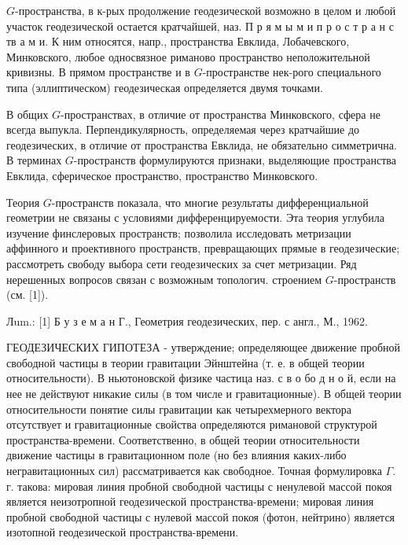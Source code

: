 \documentclass[10pt]{article}
\begin{document}
$G$-пространства, в к-рых продолжение геодезической возможно в целом и любой участок геодезической остается кратчайшей, наз. П р я м ы м и п р о с т р а н с тв а м и. К ним относятся, напр., пространства Евклида, Лобачевского, Минковского, любое односвязное риманово пространство неположительной кривизны. В прямом пространстве и в $G$-пространстве нек-рого специального типа (эллиптическом) геодезическая определяется двумя точками.



В общих $G$-пространствах, в отличие от пространства Минковского, сфера не всегда выпукла. Перпендикулярность, определяемая через кратчайшие до геодезических, в отличие от пространства Евклида, не обязательно симметрична. В терминах $G$-пространств формулируются признаки, выделяющие пространства Евклида, сферическое пространство, пространство Минковского.



Теория $G$-пространств показала, что многие результаты дифференциальной геометрии не связаны с условиями дифференцируемости. Эта теория углубила изучение финслеровых пространств; позволила исследовать метризации аффинного и проективного пространств, превращающих прямые в геодезические; рассмотреть свободу выбора сети геодезических за счет метризации. Ряд нерешенных вопросов связан с возможным топологич. строением $G$-пространств (см. [1]).



Лum.: [1] Б у з е м а н Г., Геометрия геодезических, пер. с англ., М., 1962.



ГЕОДЕЗИЧЕСКИХ ГИПОТЕЗА - утверждение; определяющее движение пробной свободной частицы в теории гравитации Эйнштейна (т. е. в общей теории относительности). В ньютоновской физике частица наз. с в о бо д н о й, если на нее не действуют никакие силы (в том числе и гравитационные). В общей теории относительности понятие силы гравитации как четырехмерного вектора отсутствует и гравитационные свойства определяются римановой структурой пространства-времени. Соответственно, в общей теории относительности движение частицы в гравитационном поле (но без влияния каких-либо негравитационных сил) рассматривается как свободное. Точная формулировка $\Gamma$. г. такова: мировая линия пробной свободной частицы с ненулевой массой покоя является неизотропной геодезической пространства-времени; мировая линия пробной свободной частицы с нулевой массой покоя (фотон, нейтрино) является изотопной геодезической пространства-времени.
\end{document}
